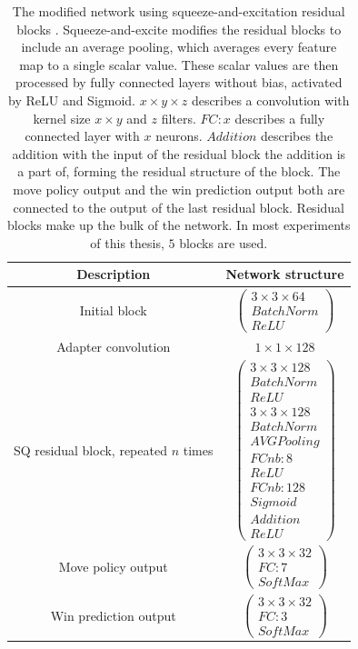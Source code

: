 \documentclass[12pt,onecolumn,oneside,titlepage]{article}
\begin{document}
\begin{table} [H]
 \centering
  \begin{tabular}{c | c }
   Description & Network structure \\
   \hline
   \hline
   Initial block & $\begin{pmatrix} 3 \times 3 \times 64 \\ BatchNorm \\ ReLU \end{pmatrix}$ \\
   \hline
   Adapter convolution & $1 \times 1 \times 128$ \\
   \hline
   SQ residual block, repeated $n$ times & $\begin{pmatrix} 3 \times 3 \times 128 \\ BatchNorm \\ ReLU \\ 3 \times 3 \times 128 \\ BatchNorm \\ AVG Pooling \\ FCnb: 8 \\ ReLU \\ FCnb: 128 \\ Sigmoid \\ Addition \\ ReLU \end{pmatrix}$ \\
   \hline 
   Move policy output & $\begin{pmatrix} 3 \times 3 \times 32 \\ FC: 7 \\ SoftMax \end{pmatrix}$ \\
   \hline
   Win prediction output & $\begin{pmatrix} 3 \times 3 \times 32 \\ FC: 3 \\ SoftMax \end{pmatrix}$
  \end{tabular}
  \caption{The modified network using squeeze-and-excitation residual blocks \cite{hu2018squeeze}.
  Squeeze-and-excite modifies the residual blocks to include an average pooling, which averages every feature map to a single scalar value. These scalar values are then processed by fully connected layers without bias, activated by ReLU and Sigmoid.
  $x \times y \times z$ describes a convolution with kernel size $x \times y$ and $z$ filters. $FC: x$ describes a fully connected layer with $x$ neurons. $Addition$ describes the addition with the input of the residual block the addition is a part of, forming the residual structure of the block.
  The move policy output and the win prediction output both are connected 
  to the output of the last residual block. Residual blocks make up the bulk of the network. In most experiments of this thesis, $5$ blocks are used.}
  \label{fig:sq_blocks_network}
\end{table}
\end{document}
